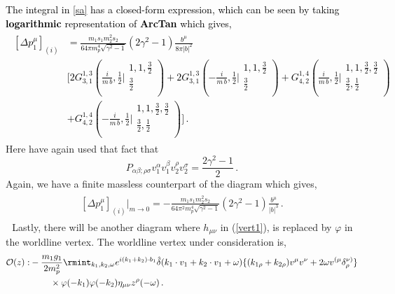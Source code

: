 \textcolor{black}{The integral in \eqref{sa} has a closed-form expression, which can be seen by taking \textbf{logarithmic }representation of  \textbf{ArcTan} which gives,
\begin{align}
    \begin{split}
        [\Delta p_1^{\mu}]_{(i)}&=\frac{m_1 s_1 m_2^2 s_2}{64\pi m_p^4\sqrt{\gamma^2-1}}(2\gamma^2-1)\frac{b^\mu}{8\pi|b|^2}\\ &\Bigg[2 G_{3,1}^{1,3}\left(\frac{i}{{m\,b}},\frac{1}{2}\Big|
\begin{array}{c}
 1,1,\frac{3}{2} \\
 \frac{3}{2} \\
\end{array}
\right)+2 G_{3,1}^{1,3}\left(-\frac{i}{{m\,b}},\frac{1}{2}\Big|
\begin{array}{c}
 1,1,\frac{3}{2} \\
 \frac{3}{2} \\
\end{array}
\right)+G_{4,2}^{1,4}\left(\frac{i}{{m\,b}},\frac{1}{2}\Big|
\begin{array}{c}
 1,1,\frac{3}{2},\frac{3}{2} \\
 \frac{3}{2},\frac{1}{2} \\
\end{array}
\right)\\ &+G_{4,2}^{1,4}\left(-\frac{i}{{m\,b}},\frac{1}{2}\Big|
\begin{array}{c}
 1,1,\frac{3}{2},\frac{3}{2} \\
 \frac{3}{2},\frac{1}{2} \\
\end{array}
\right)\Bigg]\,.
    \end{split}
\end{align}}
Here have again used that fact that $$P_{\alpha\beta;\rho\sigma}v_1^\alpha v_1^\beta v_2^\rho v_2^\sigma=\frac{2\gamma^2-1}{2}\,.$$
Again, we have a finite massless counterpart of the diagram which gives,
\begin{align}
    \begin{split}
         [\Delta p_1^{\mu}]_{(i)}\Big|_{m\to 0}=-\frac{m_1 s_1 m_2^2 s_2}{64\pi^2 m_p^4\sqrt{\gamma^2-1}}(2\gamma^2-1)\frac{b^\mu}{|b|^3}\,.\label{4.33a}
    \end{split}
\end{align}
\textbullet $\,\,$  Lastly, there will be another diagram where $h_{\mu\nu}$ in (\ref{vert1}), is replaced by $\varphi$ in the worldline vertex. The worldline vertex under consideration is,
\begin{align}
    \begin{split}
          \mathcal{O}(z):& -\frac{m_1g_1}{2m_p^2}\rmint_{k_1,k_2,\omega}e^{i(k_1+k_2)\cdot b_1}\hat\delta(k_1\cdot v_1+k_2\cdot v_1+\omega)\{(k_{1\rho}+k_{2\rho})v^{\mu}v^{\nu}+2\omega v^{(\mu}\delta_{\rho}^{\nu)}\}\\&\hspace{0.8cm}\times\varphi(-k_1)\varphi(-k_2) \eta_{\mu\nu}z^{\rho}(-\omega)\,.
    \end{split}
\end{align}
